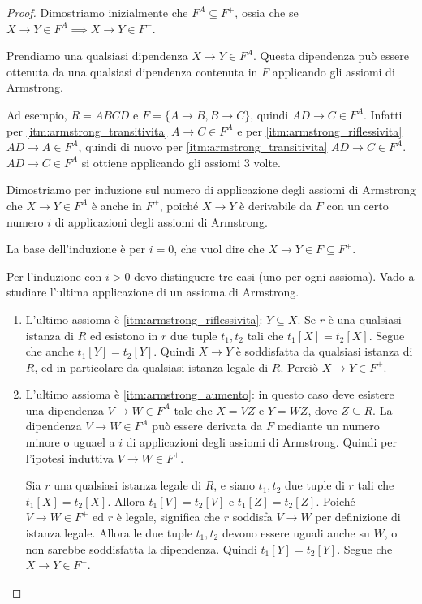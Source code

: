 \begin{proof}
Dimostriamo inizialmente che $F^A \subseteq F^+$, ossia che se $X \to Y \in F^A \implies X \to Y \in F^+$.

Prendiamo una qualsiasi dipendenza $X \to Y \in F^A$. Questa dipendenza pu\`o essere ottenuta da una qualsiasi dipendenza contenuta in $F$ applicando gli assiomi di Armstrong. 

Ad esempio, $R = ABCD$ e $F = \{ A \to B, B \to C \}$, quindi $AD \to C \in F^A$. Infatti per \ref{itm:armstrong_transitivita} $A \to C \in F^A$ e per \ref{itm:armstrong_riflessivita} $AD \to A \in F^A$, quindi di nuovo per \ref{itm:armstrong_transitivita} $AD \to C \in F^A$. $AD \to C \in F^A$ si ottiene applicando gli assiomi 3 volte.

Dimostriamo per induzione sul numero di applicazione degli assiomi di Armstrong che $X \to Y \in F^A$ \`e anche in $F^+$, poich\'e $X \to Y$ \`e derivabile da $F$ con un certo numero $i$ di applicazioni degli assiomi di Armstrong.
  
La base dell'induzione \`e per $i = 0$, che vuol dire che $X \to Y \in F \subseteq F^+$.

Per l'induzione con $i > 0$ devo distinguere tre casi (uno per ogni assioma). Vado a studiare l'ultima applicazione di un assioma di Armstrong.
\begin{enumerate}
    \item L'ultimo assioma \`e \ref{itm:armstrong_riflessivita}: $Y \subseteq X$. Se $r$ \`e una qualsiasi istanza di $R$ ed esistono in $r$ due tuple $t_1, t_2$ tali che $t_1[X] = t_2[X]$. Segue che anche $t_1[Y] = t_2[Y]$. Quindi $X \to Y$ \`e soddisfatta da qualsiasi istanza di $R$, ed in particolare da qualsiasi istanza legale di $R$. Perci\`o $X \to Y \in F^+$.
    \item L'ultimo assioma \`e \ref{itm:armstrong_aumento}: in questo caso deve esistere una dipendenza $V \to W \in F^A$ tale che $X = VZ$ e $Y = WZ$, dove $Z \subseteq R$. La dipendenza $V \to W \in F^A$ pu\`o essere derivata da $F$ mediante un numero minore o uguael a $i$ di applicazioni degli assiomi di Armstrong. Quindi per l'ipotesi induttiva $V \to W \in F^+$. 

    Sia $r$ una qualsiasi istanza legale di $R$, e siano $t_1, t_2$ due tuple di $r$ tali che $t_1[X] = t_2[X]$. Allora $t_1[V] = t_2[V]$ e $t_1[Z] = t_2[Z]$. Poich\'e $V \to W \in F^+$ ed $r$ \`e legale, significa che $r$ soddisfa $V \to W$ per definizione di istanza legale. Allora le due tuple $t_1, t_2$ devono essere uguali anche su $W$, o non sarebbe soddisfatta la dipendenza. Quindi $t_1[Y] = t_2[Y]$. Segue che $X \to Y \in F^+$.
\end{enumerate}
\end{proof}

